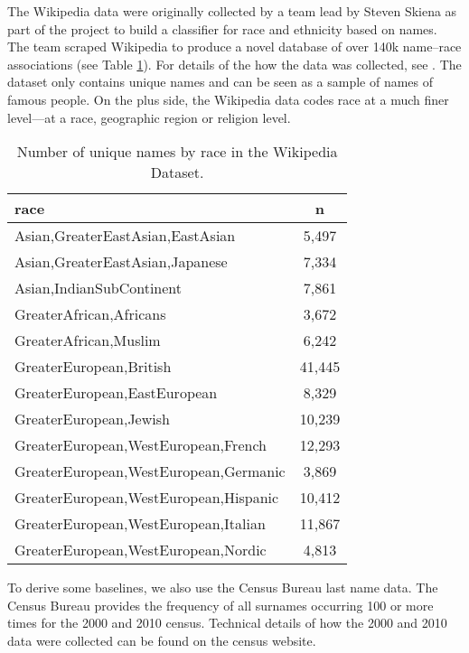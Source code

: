 \documentclass[12pt, letterpaper]{article}
\begin{document}
The Wikipedia data were originally collected by a team lead by Steven Skiena as part of the project to build a classifier for race and ethnicity based on names. The team scraped Wikipedia to produce a novel database of over 140k name--race associations (see Table \ref{table:wikipedia_data}). For details of the how the data was collected, see \citet{ambekar2009name}. The dataset only contains unique names and can be seen as a sample of names of famous people. On the plus side, the Wikipedia data codes race at a much finer level---at a race, geographic region or religion level. 

\begin{table}[h!]
\centering
\caption{Number of unique names by race in the Wikipedia Dataset.}
\begin{tabular}{ l c }
\hline    
race & n \\
\hline
Asian,GreaterEastAsian,EastAsian & 5,497 \\
Asian,GreaterEastAsian,Japanese & 7,334 \\
Asian,IndianSubContinent & 7,861 \\
GreaterAfrican,Africans & 3,672 \\
GreaterAfrican,Muslim & 6,242 \\
GreaterEuropean,British & 41,445 \\
GreaterEuropean,EastEuropean & 8,329 \\
GreaterEuropean,Jewish & 10,239 \\
GreaterEuropean,WestEuropean,French & 12,293 \\
GreaterEuropean,WestEuropean,Germanic & 3,869 \\
GreaterEuropean,WestEuropean,Hispanic & 10,412 \\
GreaterEuropean,WestEuropean,Italian & 11,867 \\
GreaterEuropean,WestEuropean,Nordic & 4,813 \\
\hline
\end{tabular}
\label{table:wikipedia_data}
\end{table}

To derive some baselines, we also use the Census Bureau last name data. The Census Bureau provides the frequency of all surnames occurring 100 or more times for the 2000 and 2010 census. Technical details of how the 2000 and 2010 data were collected can be found on the census website. 
\end{document}
